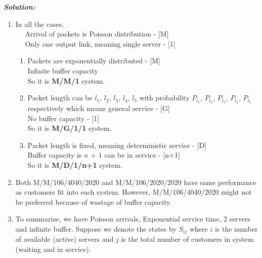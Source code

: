\documentclass[12pt, oneside]{article}
\begin{document}
\begin{enumerate}
\begin{enumerate}[label=(\alph*)]
\end{enumerate}

\textbf{\textit{Solution:}}

\begin{enumerate}[label=(\alph*)]

\item
        In all the cases,\\
        ~~ Arrival of packets is Poisson distribution - [M] \\
        ~~ Only one output link, meaning single server - [1] \\
        
        \begin{enumerate}[label=(\roman*)]
            \item Packets are exponentially distributed - [M] \\ Infinite buffer capacity \\
            So it is \textbf{M/M/1} system.
            \item Packet length can be $l_1$, $l_2$, $l_3$, $l_4$, $l_5$ with probability $P_{l_1}$, $P_{l_2}$, $P_{l_3}$, $P_{l_4}$, $P_{l_5}$ respectively which means general service - [G] \\
            No buffer capacity - [1] \\
            So it is \textbf{M/G/1/1} system.
            \item Packet length is fixed, meaning deterministic service - [D] \\
            Buffer capacity is $n$ + $1$ can be in service - [n+1] \\
            So it is \textbf{M/D/1/n+1} system.
        \end{enumerate}

\item
        Both M/M/106/4040/2020 and M/M/106/2020/2020 have same performance as customers fit into each system. However, M/M/106/4040/2020 might not be preferred because of wastage of buffer capacity. 

\item
        To summarize, we have Poisson arrivals, Exponential service time, 2 servers and infinite buffer. Suppose we denote the states by $S_{ij}$ where $i$ is the number of available (active) servers and $j$ is the total number of customers in system (waiting and in service). 
        

\end{enumerate}
\end{enumerate}
\end{document}
